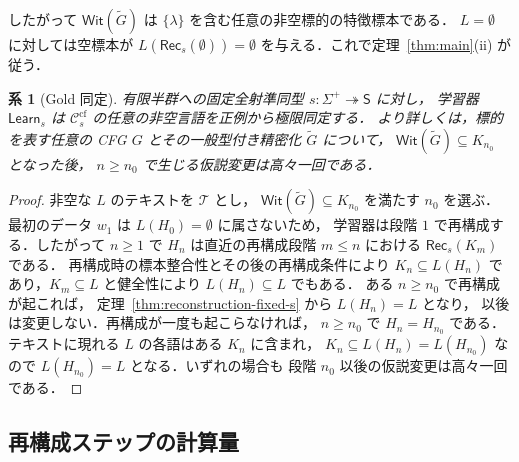 \documentclass[11pt,a4paper]{ltjsarticle}
\newtheorem{corollary}[theorem]{系}
\theoremstyle{remark}
\theoremstyle{plain}
\newcommand{\WitnessSet}{\mathsf{Wit}}
\newcommand{\cf}{\mathrm{cf}}
\newcommand{\Ccf}[1]{\mathcal C_{#1}^{\cf}}
\begin{document}
したがって $\WitnessSet(\widetilde G)$ は
$\{\lambda\}$ を含む任意の非空標的の特徴標本である．
$L=\emptyset$ に対しては空標本が
$L(\mathsf{Rec}_s(\emptyset))=\emptyset$
を与える．これで定理~\ref{thm:main}(ii) が従う．

\begin{corollary}[Gold 同定]\label{cor:ilt}
有限半群への固定全射準同型
$s:\Sigma^+\twoheadrightarrow\mathsf S$ に対し，
学習器 $\mathsf{Learn}_s$ は
$\Ccf{s}$ の任意の非空言語を正例から極限同定する．
より詳しくは，標的を表す任意の CFG $G$ とその一般型付き精密化
$\widetilde G$ について，
$\WitnessSet(\widetilde G)\subseteq K_{n_0}$ となった後，
$n\ge n_0$ で生じる仮説変更は高々一回である．
\end{corollary}
\begin{proof}
非空な $L$ のテキストを $\mathcal T$ とし，
$\WitnessSet(\widetilde G)\subseteq K_{n_0}$ を満たす $n_0$ を選ぶ．
最初のデータ $w_1$ は $L(H_0)=\emptyset$ に属さないため，
学習器は段階 $1$ で再構成する．したがって $n\ge1$ で
$H_n$ は直近の再構成段階 $m\le n$ における
$\mathsf{Rec}_s(K_m)$ である．
再構成時の標本整合性とその後の再構成条件により
$K_n\subseteq L(H_n)$ であり，$K_m\subseteq L$ と健全性により
$L(H_n)\subseteq L$ でもある．
ある $n\ge n_0$ で再構成が起これば，
定理~\ref{thm:reconstruction-fixed-s} から $L(H_n)=L$ となり，
以後は変更しない．再構成が一度も起こらなければ，
$n\ge n_0$ で $H_n=H_{n_0}$ である．
テキストに現れる $L$ の各語はある $K_n$ に含まれ，
$K_n\subseteq L(H_n)=L(H_{n_0})$ なので
$L(H_{n_0})=L$ となる．いずれの場合も
段階 $n_0$ 以後の仮説変更は高々一回である．
\end{proof}

\subsection{再構成ステップの計算量}
\label{sec:complexity}
\end{document}

